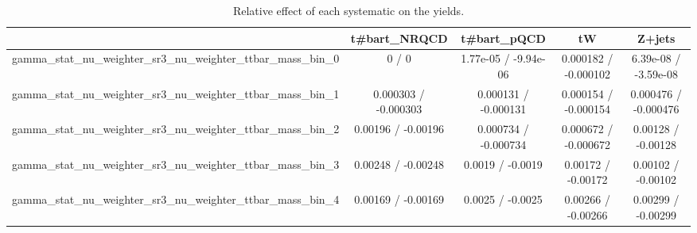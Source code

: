\documentclass[10pt]{article}
\begin{document}
\begin{table}[htbp]
\begin{center}
\begin{tabular}{|c|c|c|c|c|}
\hline 
      & t#bar{t}_{NRQCD}      & t#bar{t}_{pQCD}      & tW      & Z+jets \\ 
\hline 
  gamma_stat_nu_weighter_sr3_nu_weighter_ttbar_mass_bin_0 & 0 / 0 & 1.77e-05 / -9.94e-06 & 0.000182 / -0.000102 & 6.39e-08 / -3.59e-08 \\ 
  gamma_stat_nu_weighter_sr3_nu_weighter_ttbar_mass_bin_1 & 0.000303 / -0.000303 & 0.000131 / -0.000131 & 0.000154 / -0.000154 & 0.000476 / -0.000476 \\ 
  gamma_stat_nu_weighter_sr3_nu_weighter_ttbar_mass_bin_2 & 0.00196 / -0.00196 & 0.000734 / -0.000734 & 0.000672 / -0.000672 & 0.00128 / -0.00128 \\ 
  gamma_stat_nu_weighter_sr3_nu_weighter_ttbar_mass_bin_3 & 0.00248 / -0.00248 & 0.0019 / -0.0019 & 0.00172 / -0.00172 & 0.00102 / -0.00102 \\ 
  gamma_stat_nu_weighter_sr3_nu_weighter_ttbar_mass_bin_4 & 0.00169 / -0.00169 & 0.0025 / -0.0025 & 0.00266 / -0.00266 & 0.00299 / -0.00299 \\ 
\hline 
\end{tabular} 
\caption{Relative effect of each systematic on the yields.} 
\end{center} 
\end{table} 
\end{document}
